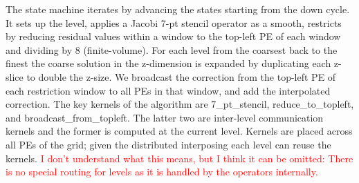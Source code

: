 \documentclass[sigconf]{acmart}
\begin{document}
    The state machine iterates by advancing the states starting from the down cycle. It sets up the level, applies a Jacobi 7-pt stencil operator as a smooth, restricts by reducing residual values within a window to the top-left PE of each window and dividing by 8 (finite-volume). For each level from the coarsest back to the finest the coarse solution in the z-dimension is expanded by duplicating each z-slice to double the z-size. We broadcast the correction from the top-left PE of each restriction window to all PEs in that window, and add the interpolated correction.  The key kernels of the algorithm are 7\_pt\_stencil, reduce\_to\_topleft, and broadcast\_from\_topleft. The latter two are inter-level communication kernels and the former is computed at the current level. Kernels are placed across all PEs of the grid; given the distributed interposing each level can reuse the kernels. \textcolor{red}{I don't understand what this means, but I think it can be omitted: There is no special routing for levels as it is handled by the operators internally.}
\end{document}
